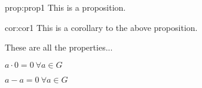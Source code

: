 
\begin{prop}{prop:prop1}
This is a proposition.
\end{prop}

\begin{cor}{cor:cor1}
This is a corollary to the above proposition.
\end{cor}

\begin{prope}[EasyClass]
These are all the properties...
\begin{enum}
    \item $a \cdot 0 = 0~\forall a \in G$
    \item $a - a = 0~\forall a \in G$
\end{enum}
\end{prope}
